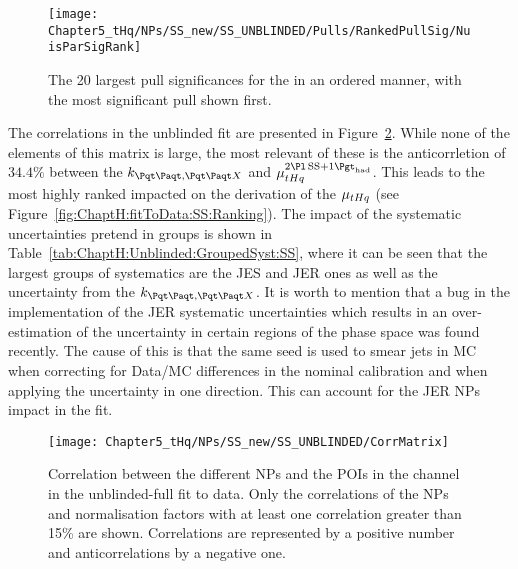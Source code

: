 \begin{figure}[h]
\centering
 \texttt{[image: Chapter5\_tHq/NPs/SS\_new/SS\_UNBLINDED/Pulls/RankedPullSig/NuisParSigRank]}
\caption{The 20 largest pull significances for the \dilepSStau in an ordered manner, with the most significant  pull shown first.} 
\label{fig:ChaptH:fitToData:SS:RankedPull}
\end{figure} 
The correlations in the unblinded fit are presented in Figure~\ref{fig:ChaptH:fitToData:SS:Correlation}.
While none of the elements of this matrix is large, the most relevant of these is the anticorrletion of $34.4\%$ between the  $k_{\ttbar,\ttX}$ and $\mu^{\dilepSStau}_{\tHq}$. %
This leads to the most highly ranked impacted  on the derivation of the $\mu_{tHq}$ (see Figure~\ref{fig:ChaptH:fitToData:SS:Ranking}). 
The impact of the systematic uncertainties pretend in groups is shown in Table~\ref{tab:ChaptH:Unblinded:GroupedSyst:SS}, where it can be seen that the largest groups of systematics are the JES and JER ones as well as the uncertainty from the $k_{\ttbar,\ttX}$. 
It is worth to mention that a bug in the implementation of the JER systematic uncertainties
which results in an over-estimation of the uncertainty in certain regions of the phase space
was found recently. The cause of this is that the same seed is used to smear jets in MC when correcting
for Data/MC differences in the nominal calibration and when applying the uncertainty in one direction.
This can account for the JER NPs impact in the fit.


\begin{figure}[h]
\centering
 \texttt{[image: Chapter5\_tHq/NPs/SS\_new/SS\_UNBLINDED/CorrMatrix]}
\caption{Correlation between the different NPs and the POIs in the \dilepSStau channel in the unblinded-full fit to data. 
Only the correlations of the NPs and normalisation factors with at least one correlation greater than 15\% are shown.
Correlations are represented by a positive number and anticorrelations by a negative one.} 
\label{fig:ChaptH:fitToData:SS:Correlation}
\end{figure}

